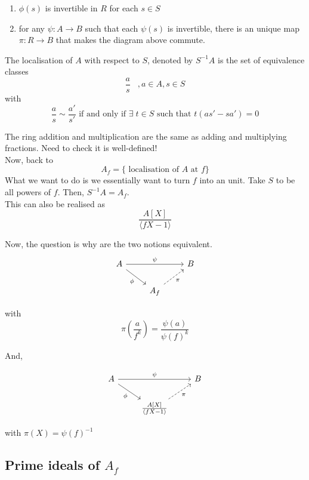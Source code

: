 \documentclass[oneside, 12pt, ]{scrbook}
\theoremstyle{theorem}
\begin{document}
\begin{enumerate}
\item $\phi(s)$ is invertible in $R$ for each $s\in S$
\item for any $\psi : A \rightarrow B$ such that each $\psi (s)$ is invertible, there is an unique map $\pi : R \rightarrow B$ that makes the diagram above commute.
\end{enumerate}

\begin{definition}
The localisation of $A$ with respect to $S$, denoted by $S^{-1}A$ is the set of equivalence classes $$\frac{a}{s} \;\;\;, a \in A , s \in S$$ with $$\frac{a}{s} \sim \frac{a'}{s'} \text{ if and only if } \exists \; t \in S \text{ such that } t (as' - sa')=0$$ 
\end{definition}

The ring addition and multiplication are the same as adding and multiplying fractions. Need to check it is well-defined!\\

Now, back to $$A_{f} = \{\text{ localisation of $A$ at }f\}$$ What we want to do is we essentially want to turn $f$ into an unit. Take $S$ to be all powers of $f$. Then, $S^{-1}A = A_{f}$. \\

This can also be realised as $$\frac{A[X]}{\langle fX-1 \rangle}$$

Now, the question is why are the two notions equivalent. 
\[\begin{tikzcd}
	A && B \\
	& {A_{f}}
	\arrow["\psi", from=1-1, to=1-3]
	\arrow["\phi"', from=1-1, to=2-2]
	\arrow["\pi"', dashed, from=2-2, to=1-3]
\end{tikzcd}\]

with $$\pi\left( \frac{a}{f^k} \right) = \frac{\psi (a)}{\psi (f)^k}$$

And, 

\[\begin{tikzcd}
	A && B \\
	& {\frac{A[X]}{\langle fX - 1 \rangle}}
	\arrow["\psi", from=1-1, to=1-3]
	\arrow["\phi"', from=1-1, to=2-2]
	\arrow["\pi"', dashed, from=2-2, to=1-3]
\end{tikzcd}\]

with $\pi(X) = \psi(f)^{-1}$ \\

\subsection{Prime ideals of $A_{f}$}
\end{document}
